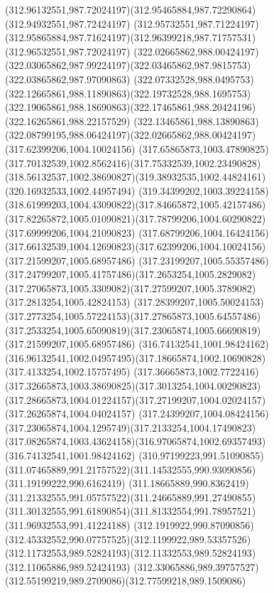 {{  \curveto(312.96132551,987.72024197)(312.95465884,987.72290864)(312.94932551,987.72424197)
  \lineto(312.95732551,987.71224197)
  \curveto(312.95865884,987.71624197)(312.96399218,987.71757531)(312.96532551,987.72024197)
  \moveto(322.02665862,988.00424197)
  \curveto(322.03065862,987.99224197)(322.03465862,987.9815753)(322.03865862,987.97090863)
  \curveto(322.07332528,988.0495753)(322.12665861,988.11890863)(322.19732528,988.1695753)
  \curveto(322.19065861,988.18690863)(322.17465861,988.20424196)(322.16265861,988.22157529)
  \curveto(322.13465861,988.13890863)(322.08799195,988.06424197)(322.02665862,988.00424197)
  \moveto(317.62399206,1004.10024156)
  \curveto(317.65865873,1003.47890825)(317.70132539,1002.8562416)(317.75332539,1002.23490828)
  \curveto(318.56132537,1002.38690827)(319.38932535,1002.44824161)(320.16932533,1002.44957494)
  \curveto(319.34399202,1003.39224158)(318.61999203,1004.43090822)(317.84665872,1005.42157486)
  \curveto(317.82265872,1005.01090821)(317.78799206,1004.60290822)(317.69999206,1004.21090823)
  \curveto(317.68799206,1004.16424156)(317.66132539,1004.12690823)(317.62399206,1004.10024156)
  \moveto(317.21599207,1005.68957486)
  \curveto(317.23199207,1005.55357486)(317.24799207,1005.41757486)(317.2653254,1005.2829082)
  \curveto(317.27065873,1005.3309082)(317.27599207,1005.3789082)(317.2813254,1005.42824153)
  \curveto(317.28399207,1005.50024153)(317.2773254,1005.57224153)(317.27865873,1005.64557486)
  \curveto(317.2533254,1005.65090819)(317.23065874,1005.66690819)(317.21599207,1005.68957486)
  \moveto(316.74132541,1001.98424162)
  \curveto(316.96132541,1002.04957495)(317.18665874,1002.10690828)(317.4133254,1002.15757495)
  \curveto(317.36665873,1002.7722416)(317.32665873,1003.38690825)(317.3013254,1004.00290823)
  \curveto(317.28665873,1004.01224157)(317.27199207,1004.02024157)(317.26265874,1004.04024157)
  \curveto(317.24399207,1004.08424156)(317.23065874,1004.1295749)(317.2133254,1004.17490823)
  \curveto(317.08265874,1003.43624158)(316.97065874,1002.69357493)(316.74132541,1001.98424162)
  \moveto(310.97199223,991.51090855)
  \curveto(311.07465889,991.21757522)(311.14532555,990.93090856)(311.19199222,990.6162419)
  \curveto(311.18665889,990.8362419)(311.21332555,991.05757522)(311.24665889,991.27490855)
  \curveto(311.30132555,991.61890854)(311.81332554,991.78957521)(311.96932553,991.41224188)
  \curveto(312.1919922,990.87090856)(312.45332552,990.07757525)(312.1199922,989.53357526)
  \curveto(312.11732553,989.52824193)(312.11332553,989.52824193)(312.11065886,989.52424193)
  \curveto(312.33065886,989.39757527)(312.55199219,989.2709086)(312.77599218,989.1509086)
}}

